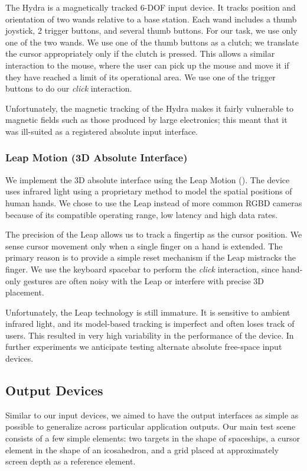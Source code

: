 The Hydra is a magnetically tracked 6-DOF input device. It tracks position and
orientation of two wands relative to a base station. Each wand includes a thumb
joystick, 2 trigger buttons, and several thumb buttons. For our task, we use
only one of the two wands. We use one of the thumb buttons as a clutch; we
translate the cursor appropriately only if the clutch is pressed. This allows a
similar interaction to the mouse, where the user can pick up the mouse and move
it if they have reached a limit of its operational area. We use one of the
trigger buttons to do our {\it click} interaction.

Unfortunately, the magnetic tracking of the Hydra makes it fairly vulnerable to
magnetic fields such as those produced by large electronics; this meant that it
was ill-suited as a registered absolute input interface.

\subsubsection{Leap Motion (3D Absolute Interface)}
We implement the 3D absolute interface using the Leap Motion
(). The device uses
infrared light using a proprietary method to model the spatial positions of
human hands. We chose to use the Leap instead of more common
RGBD cameras because of its compatible operating range, low latency and high
data rates.

The precision of the Leap allows us to track a fingertip as the cursor
position.  We sense cursor movement only when a single finger on a hand is
extended. The primary reason is to provide a simple reset mechanism if the
Leap mistracks the finger. We use the keyboard spacebar to perform the
{\it click} interaction, since hand-only gestures are often noisy with the Leap
or interfere with precise 3D placement.

Unfortunately, the Leap technology is still immature. It is sensitive to
ambient infrared light, and its model-based tracking is imperfect and often
loses track of users. This resulted in very high variability in the
performance of the device. In further experiments we anticipate testing
alternate absolute free-space input devices.

\subsection{Output Devices}
Similar to our input devices, we aimed to have the output interfaces as simple
as possible to generalize across particular application outputs. Our main test
scene consists of a few simple elements: two targets in the shape of
spaceships, a cursor element in the shape of an icosahedron, and a grid placed
at approximately screen depth as a reference element.

